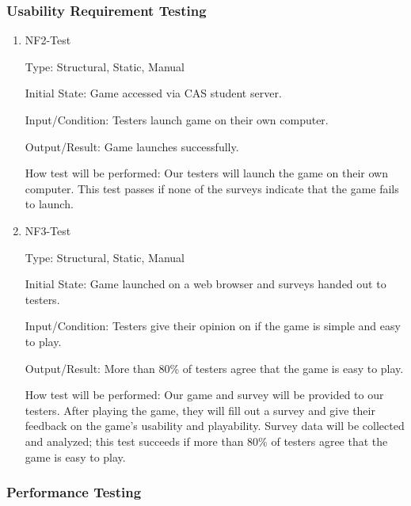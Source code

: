 \documentclass[12pt, titlepage]{article}
\begin{document}
\subsubsection{ Usability Requirement Testing}

\begin{enumerate}

\item{NF2-Test\\}

Type: Structural, Static, Manual
					
Initial State: Game accessed via CAS student server.
					
Input/Condition: Testers launch game on their own computer.
					
Output/Result: Game launches successfully.
					
How test will be performed: Our testers will launch the game on their own computer. This test passes if none of the surveys indicate that the game fails to launch.


\item{NF3-Test\\}

Type: Structural, Static, Manual
					
Initial State: Game launched on a web browser and surveys handed out to testers.
					
Input/Condition: Testers give their opinion on if the game is simple and easy to play.
					
Output/Result: More than 80\% of testers agree that the game is easy to play.
					
How test will be performed: Our game and survey will be provided to our testers. After playing the game, they will fill out a survey and give their feedback on the game's usability and playability. Survey data will be collected and analyzed; this test succeeds if more than 80\% of testers agree that the game is easy to play.

\end{enumerate}

\subsubsection{Performance Testing}
\end{document}
